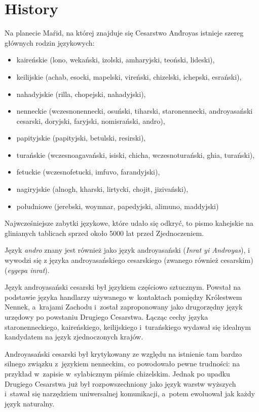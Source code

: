 \chapter{History}
\label{ch:history}

Na planecie Maŕid, na której znajduje się Cesarstwo And́royas istnieje szereg
głównych rodzin językowych:

\begin{itemize}
    \item kaireńskie (lono, wekański, izolski, amharyjski, teoński, lideski),
    \item keilijskie (achab, esocki, mapelski, vireński, chizelski, ichepski,
    esrański),
    \item nahadyjskie (rilla, chopejski, nahadyjski),
    \item nenneckie (wczesnonennecki, osuński, tiharski, staronennecki,
    androyasański cesarski, doryjski, faryjski, nomisrański, andro),
    \item papityjskie (papityjski, betulski, resirski),
    \item turańskie (wczesnoagavański, isiski, chicha, wczesnoturański, ghia,
    turański),
    \item fetuckie (wczesnofetucki, imfuvo, farandyjski),
    \item nagiryjskie (alnogh, kharski, lirtycki, chojit, jizivański),
    \item południowe (jerebski, woymnar, papedyjski, alimuno, maddyjski)
\end{itemize}

Najwcześniejsze zabytki językowe, które udało się odkryć, to pismo kahejskie na 
glinianych tablicach sprzed około 5000 lat przed Zjednoczeniem.

Język \emph{andro} znany jest również jako język androyasański (\emph{Inrat yi
Androyas}), i wywodzi się z języka androyasańskiego cesarskiego (zwanego również
cesarskim) (\emph{eygepa inrat}).

Język androyasański cesarski był językiem częściowo sztucznym. Powstał na
podstawie języka handlarzy używanego w~kontaktach pomiędzy Królestwem Nennek,
a~krajami Zachodu i~został zaproponowany jako drugorzędny język urzędowy po
powstaniu Drugiego Cesarstwa. Łącząc cechy języka staronenneckiego,
kaireńskiego, keilijskiego i~turańskiego wydawał się idealnym kandydatem na
język zjednoczonych krajów.

Androyasański cesarski był krytykowany ze względu na istnienie tam bardzo 
silnego związku z~językiem nenneckim, co powodowało pewne trudności: na przykład 
w~zapisie w~sylabicznym piśmie chizelskim. Jednak po upadku Drugiego Cesarstwa 
już był rozpowszechniony jako język warstw wyższych i~stawał się narzędziem 
uniwersalnej komunikacji, a~potem ewoluował jak każdy język naturalny.

